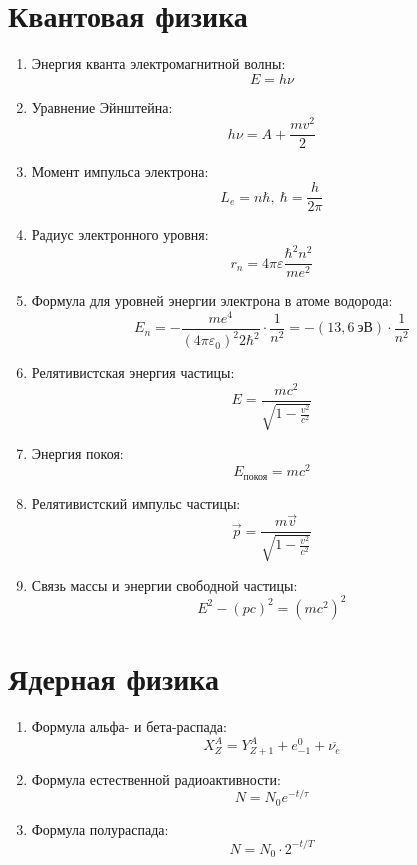 	\section{Квантовая физика}
		\begin{enumerate}
			\item Энергия кванта электромагнитной волны: \[ E = h \nu \]
			\item Уравнение Эйнштейна: \[ h \nu = A + \frac{mv^2}{2} \]
			\item Момент импульса электрона: \[ L_e = n \hbar, \ \hbar = \frac{h}{2 \pi} \]
			\item Радиус электронного уровня: \[ r_n = 4 \pi \varepsilon \frac{\hbar^2 n^2}{m e^2} \]
			\item Формула для уровней энергии электрона в атоме водорода: \[ E_n = - \frac{me^4}{(4 \pi \varepsilon_0)^2 2 \hbar^2} \cdot \frac{1}{n^2} = -(13,6 \ \text{эВ}) \cdot \frac{1}{n^2} \]
			\item Релятивистская энергия частицы: \[ E = \frac{mc^2}{\sqrt{1 - \frac{v^2}{c^2}}} \]
			\item Энергия покоя: \[ E_{\text{покоя}} = mc^2 \]
			\item Релятивистский импульс частицы: \[ \overrightarrow{p} = \frac{m \overrightarrow{v}}{\sqrt{1 - \frac{v^2}{c^2}}} \]
			\item Связь массы и энергии свободной частицы: \[ E^2 - (pc)^2 = \left( mc^2 \right)^2 \]
		\end{enumerate}
	
	\section{Ядерная физика}
		\begin{enumerate}
			\item Формула альфа- и бета-распада: \[ X^A_Z = Y_{Z+1}^A + e_{-1}^0 + \overline{\nu_e} \]
			\item Формула естественной радиоактивности: \[ N = N_0 e^{-t / \tau} \]
			\item Формула полураспада: \[ N = N_0 \cdot 2^{-t / T} \]
		\end{enumerate}
		
